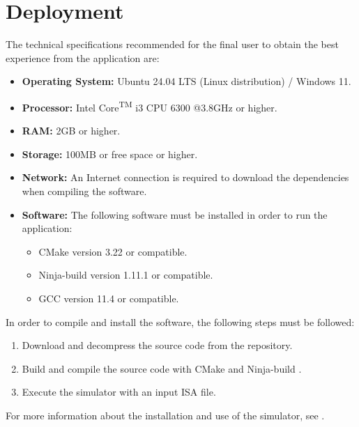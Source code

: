 \section{Deployment}
The technical specifications recommended for the final user to obtain the best experience from the application are:
\begin{itemize}
  \item \textbf{Operating System:} Ubuntu 24.04 LTS (Linux distribution) / Windows 11.
  \item \textbf{Processor:} Intel\textsuperscript{\textregistered} Core\textsuperscript{TM} i3 CPU 6300 @3.8GHz or higher.
  \item \textbf{\gls{RAM}:} 2GB or higher.
  \item \textbf{Storage:} 100MB or free space or higher.
  \item \textbf{Network:} An Internet connection is required to download the dependencies when compiling the software.
  \item \textbf{Software:} The following software must be installed in order to run the application:
  \begin{itemize}
    \item CMake \parencite{cmake} version 3.22 or compatible.
    \item Ninja-build \parencite{ninja} version 1.11.1 or compatible.
    \item GCC \parencite{gcc} version 11.4 or compatible.
  \end{itemize}
\end{itemize}

\noindent
In order to compile and install the software, the following steps must be followed:
\begin{enumerate}
  \item Download and decompress the source code from the repository.
  \item Build and compile the source code with CMake \parencite{cmake} and Ninja-build \parencite{ninja}.
  \item Execute the simulator with an input \gls{ISA} file.
\end{enumerate}

For more information about the installation and use of the simulator, see .

